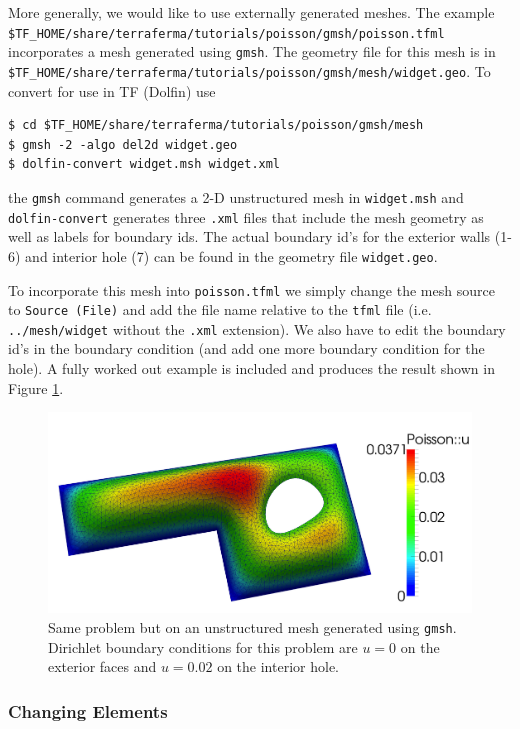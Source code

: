 More generally, we would like to use externally generated meshes.  The
example \texttt{\$TF\_HOME/share/terraferma/tutorials/poisson/gmsh/poisson.tfml}
incorporates a mesh generated using \texttt{gmsh}.  The geometry file
for this mesh is in
\texttt{\$TF\_HOME/share/terraferma/tutorials/poisson/gmsh/mesh/widget.geo}. To convert
for use in TF (Dolfin) use
\begin{lstlisting}[style=Bash]
$ cd $TF_HOME/share/terraferma/tutorials/poisson/gmsh/mesh
$ gmsh -2 -algo del2d widget.geo
$ dolfin-convert widget.msh widget.xml
\end{lstlisting}
the \texttt{gmsh} command generates a 2-D unstructured mesh in
\texttt{widget.msh} and  \texttt{dolfin-convert} generates three
\texttt{.xml} files that include the mesh geometry as well as labels
for boundary ids.  The actual boundary id's for the exterior walls
(1-6) and interior hole (7) can be found in the geometry file
\texttt{widget.geo}.

To incorporate this mesh into \texttt{poisson.tfml} we simply change
the mesh source to \texttt{Source (File)} and add the file name
relative to the \texttt{tfml} file (i.e. \texttt{../mesh/widget}
without the \texttt{.xml} extension). We also have to edit the
boundary id's in the boundary condition (and add one more boundary
condition for the hole).  A fully worked out example is included and
produces the result shown in Figure \ref{fig:poisson_gmsh}.
\begin{figure}[h!]
  \centering
\includegraphics[width=.8\textwidth]{figures/poisson_simple_gmsh}
  \caption{\small Same problem but on an unstructured mesh generated using
    \texttt{gmsh}. Dirichlet boundary conditions for this problem are $u=0$ on
    the exterior faces and $u=0.02$ on the interior hole. }
\label{fig:poisson_gmsh}
\end{figure}


\subsubsection{Changing Elements}
\label{sec:changing-meshes}

